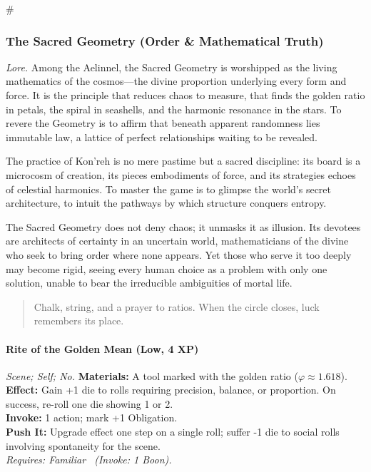# %

\subsubsection{The Sacred Geometry (Order \& Mathematical Truth)}
\textit{Lore.} Among the Aelinnel, the Sacred Geometry is worshipped as the living mathematics of the cosmos—the divine proportion underlying every form and force. It is the principle that reduces chaos to measure, that finds the golden ratio in petals, the spiral in seashells, and the harmonic resonance in the stars. To revere the Geometry is to affirm that beneath apparent randomness lies immutable law, a lattice of perfect relationships waiting to be revealed.  

The practice of Kon'reh is no mere pastime but a sacred discipline: its board is a microcosm of creation, its pieces embodiments of force, and its strategies echoes of celestial harmonics. To master the game is to glimpse the world’s secret architecture, to intuit the pathways by which structure conquers entropy.  

The Sacred Geometry does not deny chaos; it unmasks it as illusion. Its devotees are architects of certainty in an uncertain world, mathematicians of the divine who seek to bring order where none appears. Yet those who serve it too deeply may become rigid, seeing every human choice as a problem with only one solution, unable to bear the irreducible ambiguities of mortal life.

\begin{quote}
Chalk, string, and a prayer to ratios. When the circle closes, luck remembers its place.
\end{quote}

\paragraph*{Rite of the Golden Mean (Low, 4 XP)} \emph{Scene; Self; No.}
\textbf{Materials:} A tool marked with the golden ratio ($\varphi \approx 1.618$).\\
\textbf{Effect:} Gain +1 die to rolls requiring precision, balance, or proportion. On success, re-roll one die showing 1 or 2.\\
\textbf{Invoke:} 1 action; mark +1 Obligation.\\
\textbf{Push It:} Upgrade effect one step on a single roll; suffer -1 die to social rolls involving spontaneity for the scene.\\
\emph{Requires: Familiar \ (\textit{Invoke:} 1 Boon).}

